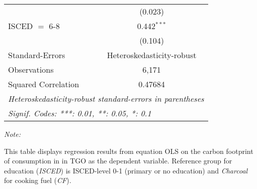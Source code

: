 \begin{table}[htbp!]
\begin{adjustbox}{width = 1\textwidth, max height = 0.95\textheight, center}
\begin{threeparttable}[b]
\begin{tabular}{lc}
                                & (0.023)\\   
            ISCED $=$ 6-8       & 0.442$^{***}$\\   
                                & (0.104)\\   
            \midrule 
            Standard-Errors     & Heteroskedasticity-robust \\   
            Observations        & 6,171\\  
            Squared Correlation & 0.47684\\  
            \midrule \midrule
            \multicolumn{2}{l}{\emph{Heteroskedasticity-robust standard-errors in parentheses}}\\
            \multicolumn{2}{l}{\emph{Signif. Codes: ***: 0.01, **: 0.05, *: 0.1}}\\
         \end{tabular}
         
         \begin{tablenotes}\item \medskip \textit{Note:}
            \item This table displays regression results from equation OLS on the carbon footprint of consumption in  in TGO as the dependent variable.  Reference group for education (\textit{ISCED}) is ISCED-level 0-1 (primary or no education) and \textit{Charcoal} for cooking fuel (\textit{CF}).
         \end{tablenotes}
      \end{threeparttable}
   \end{adjustbox}
\end{table}


